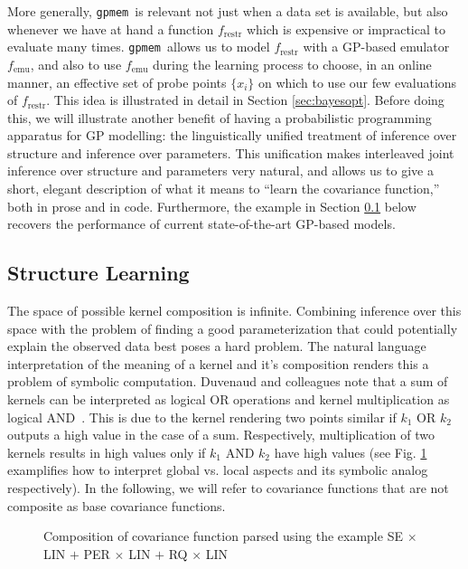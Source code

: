 \documentclass{article} %
\newcommand{\gpmem}{\texttt{gpmem}}
\newcommand{\emu}{{\textrm{emu}}}
\newcommand{\restr}{{\textrm{restr}}}
\begin{document}
More generally, \gpmem\ is relevant not just when a data set is available, but also whenever we have at hand a function $f_\restr$ which is expensive or impractical to evaluate many times.
\gpmem\ allows us to model $f_\restr$ with a GP-based emulator $f_\emu$, and also to use $f_\emu$ during the learning process to choose, in an online manner, an effective set of probe points $\{x_i\}$ on which to use our few evaluations of $f_\restr$.
This idea is illustrated in detail in Section \ref{sec:bayesopt}.
Before doing this, we will illustrate another benefit of having a probabilistic programming apparatus for GP modelling: the linguistically unified treatment of inference over structure and inference over parameters.
This unification makes interleaved joint inference over structure and parameters very natural, and allows us to give a short, elegant description of what it means to ``learn the covariance function,'' both in prose and in code.
Furthermore, the example in Section \ref{sec:structurelearning} below recovers the performance of current state-of-the-art GP-based models.



\subsection{Structure Learning}\label{sec:structurelearning}
The space of possible kernel composition is infinite. Combining inference over this space with the problem of finding a good parameterization that could potentially explain the observed data best poses a hard problem. The natural language interpretation of the meaning of a kernel and it's composition renders this a problem of symbolic computation. Duvenaud and colleagues note that a sum of kernels can be interpreted as logical OR operations and kernel multiplication as logical AND~\citeyearpar{duvenaud2013structure}. This is due to the kernel rendering two points similar if $k_1$ OR $k_2$ outputs a high value in the case of a sum. Respectively, multiplication of two kernels results in high values only if $k_1$ AND $k_2$ have high values (see Fig. \ref{fig:composite} examplifies how to interpret global vs. local aspects and its symbolic analog respectively). 
In the following, we will refer to covariance functions that are not composite as base covariance functions.

\begin{figure}
\centering

\caption{Composition of covariance function parsed using the example SE $\times$ LIN $+$ PER $\times$ LIN $+$  RQ $\times$ LIN}\label{fig:composite}
\end{figure}
\end{document}
